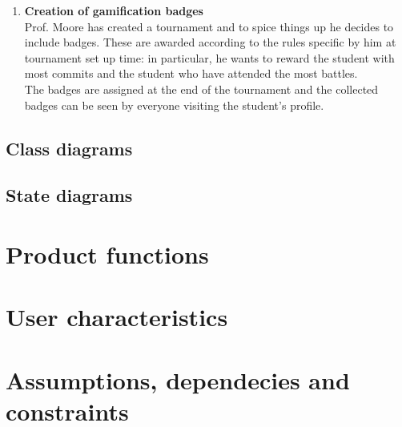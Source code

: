 \begin{enumerate}
    \item \textbf{Creation of gamification badges}\\
    Prof. Moore has created a tournament and to spice things up he decides to include badges.
    These are awarded according to the rules specific by him at tournament set up time: in particular,
     he wants to reward the student with most commits and the student who have attended the most battles.\\
    The badges are assigned at the end of the tournament and the collected badges can be seen by everyone
     visiting the student's profile. \\
\end{enumerate}

\subsection{Class diagrams}

\subsection{State diagrams}

\section{Product functions}

\section{User characteristics}

\section{Assumptions, dependecies and constraints}

